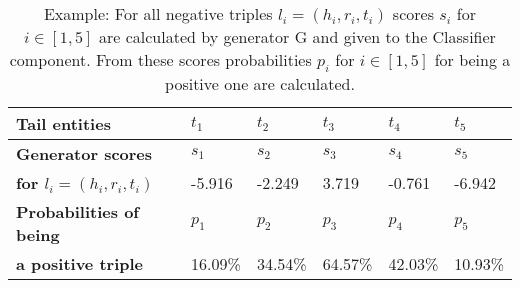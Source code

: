 \begin{table}[h]
    \centering
    \begin{tabular}{llllll}
        \toprule
        
        \textbf{Tail entities}
        &  \textbf{$t_1$} & \textbf{$t_2$} & \textbf{$t_3$} & \textbf{$t_4$} & \textbf{$t_5$} \\
         
        \midrule
        
        \textbf{Generator scores}
         & $s_1$ & $s_2$ & $s_3$ & $s_4$ & $s_5$ \\
        
        \textbf{for $l_i = (h_i, r_i, t_i)$}
        & -5.916 
        & -2.249  
        & 3.719 
        & -0.761 
        & -6.942 \\
        
        \midrule
                        
        \textbf{Probabilities of being} 
        & $p_1$ & $p_2$ & $p_3$ & $p_4$ & $p_5$ \\
        
        \textbf{a positive triple}
        & 16.09\% 
        & 34.54\% 
        & 64.57\% 
        & 42.03\% 
        & 10.93\%  \\

        \bottomrule
    \end{tabular}
    \caption{Example: For all negative triples $l_i = (h_i, r_i, t_i)$ scores $s_i$ for $i \in [1,5]$ are calculated by generator G and given to the Classifier component.
    From these scores probabilities $p_i$ for $i \in [1, 5]$ for being a positive one are calculated.}
\label{tab:positive_probabilities}
\end{table}